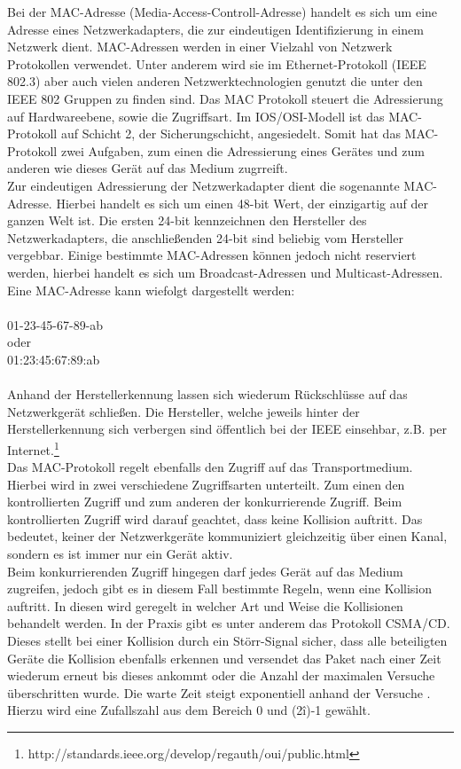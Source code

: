 Bei der MAC-Adresse (Media-Access-Controll-Adresse) handelt es sich um eine Adresse eines Netzwerkadapters, die zur eindeutigen Identifizierung in einem Netzwerk dient. MAC-Adressen werden in einer Vielzahl von Netzwerk Protokollen verwendet. Unter anderem wird sie im Ethernet-Protokoll (IEEE 802.3)  aber auch vielen anderen Netzwerktechnologien genutzt die unter den IEEE 802 Gruppen zu finden sind.
Das MAC Protokoll steuert die Adressierung auf Hardwareebene, sowie die Zugriffsart.
Im IOS/OSI-Modell ist das MAC-Protokoll auf Schicht 2, der Sicherungschicht, angesiedelt.
Somit hat das MAC-Protokoll zwei Aufgaben, zum einen die Adressierung eines Gerätes und zum anderen wie dieses Gerät auf das Medium zugrreift.\\
Zur eindeutigen Adressierung der Netzwerkadapter  dient die sogenannte MAC-Adresse. Hierbei handelt es sich um einen 48-bit Wert, der einzigartig auf der ganzen Welt ist. Die ersten 24-bit kennzeichnen den Hersteller des Netzwerkadapters, die anschließenden 24-bit sind beliebig vom Hersteller vergebbar. Einige bestimmte MAC-Adressen können jedoch nicht reserviert werden, hierbei handelt  es sich um Broadcast-Adressen und Multicast-Adressen.
Eine MAC-Adresse kann wiefolgt dargestellt werden:\\
\\
01-23-45-67-89-ab\\
oder\\
01:23:45:67:89:ab\\
\\
Anhand der Herstellerkennung lassen sich wiederum Rückschlüsse auf das Netzwerkgerät schließen. Die Hersteller, welche jeweils hinter der Herstellerkennung sich verbergen sind öffentlich bei der IEEE einsehbar, z.B. per Internet.\footnote{http://standards.ieee.org/develop/regauth/oui/public.html}\\
Das MAC-Protokoll regelt ebenfalls den Zugriff auf das Transportmedium. Hierbei wird in zwei verschiedene Zugriffsarten unterteilt. Zum einen den kontrollierten Zugriff und zum anderen der konkurrierende Zugriff.
Beim kontrollierten Zugriff wird darauf geachtet, dass keine Kollision auftritt. Das bedeutet, keiner der Netzwerkgeräte kommuniziert gleichzeitig über einen Kanal, sondern es ist immer nur ein Gerät aktiv.\\
Beim konkurrierenden Zugriff hingegen darf jedes Gerät auf das Medium zugreifen, jedoch gibt es in diesem Fall bestimmte Regeln, wenn eine Kollision auftritt. In diesen wird geregelt in welcher Art und Weise die Kollisionen behandelt werden. In der Praxis gibt es unter anderem das Protokoll CSMA/CD. Dieses stellt bei einer Kollision durch ein Störr-Signal sicher, dass alle beteiligten Geräte die Kollision ebenfalls erkennen und versendet das Paket nach einer Zeit wiederum erneut bis dieses ankommt oder die Anzahl der maximalen Versuche überschritten wurde. Die warte Zeit steigt exponentiell anhand der Versuche . Hierzu wird eine Zufallszahl aus dem Bereich 0 und (2\^i)-1 gewählt.

